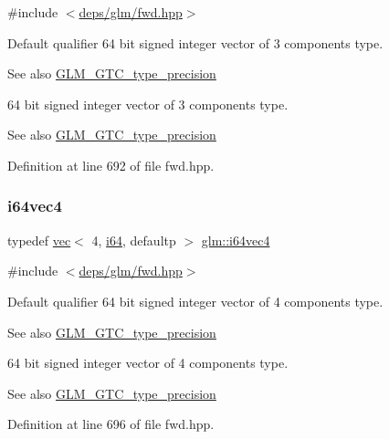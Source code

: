 {\ttfamily \#include $<$\hyperlink{fwd_8hpp}{deps/glm/fwd.\+hpp}$>$}

Default qualifier 64 bit signed integer vector of 3 components type. \begin{DoxySeeAlso}{See also}
\hyperlink{group__gtc__type__precision}{G\+L\+M\+\_\+\+G\+T\+C\+\_\+type\+\_\+precision}
\end{DoxySeeAlso}
64 bit signed integer vector of 3 components type. \begin{DoxySeeAlso}{See also}
\hyperlink{group__gtc__type__precision}{G\+L\+M\+\_\+\+G\+T\+C\+\_\+type\+\_\+precision} 
\end{DoxySeeAlso}


Definition at line 692 of file fwd.\+hpp.

\mbox{\label{group__gtc__type__precision_ga77db970d924dd55ac93e00391ad4a10e}} 
\subsubsection{\texorpdfstring{i64vec4}{i64vec4}}
{\footnotesize\ttfamily typedef \hyperlink{structglm_1_1vec}{vec}$<$ 4, \hyperlink{group__gtc__type__precision_gac7a7eaad46064fc952b06df33689da23}{i64}, defaultp $>$ \hyperlink{group__gtc__type__precision_ga77db970d924dd55ac93e00391ad4a10e}{glm\+::i64vec4}}



{\ttfamily \#include $<$\hyperlink{fwd_8hpp}{deps/glm/fwd.\+hpp}$>$}

Default qualifier 64 bit signed integer vector of 4 components type. \begin{DoxySeeAlso}{See also}
\hyperlink{group__gtc__type__precision}{G\+L\+M\+\_\+\+G\+T\+C\+\_\+type\+\_\+precision}
\end{DoxySeeAlso}
64 bit signed integer vector of 4 components type. \begin{DoxySeeAlso}{See also}
\hyperlink{group__gtc__type__precision}{G\+L\+M\+\_\+\+G\+T\+C\+\_\+type\+\_\+precision} 
\end{DoxySeeAlso}


Definition at line 696 of file fwd.\+hpp.

\mbox{\label{group__gtc__type__precision_gaae064be68b7d36cd7910c16e8ad18bba}} 
